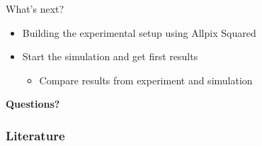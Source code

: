 \begin{frame}{\huge{What's next?}}
  \begin{itemize}
    \setlength\itemsep{1em}
    \item Building the experimental setup using Allpix Squared
    \item Start the simulation and get first results
    \begin{itemize}
      \item[\rightarrow] Compare results from experiment and simulation
    \end{itemize}
  \end{itemize}
\end{frame}
\begin{frame}
  \centering \Huge\textcolor{tugreen}{\textbf{Questions?}}
\end{frame}

\appendix
\begin{frame}[t]
\frametitle{\huge{Literature}}
\printbibliography{}
\end{frame}

